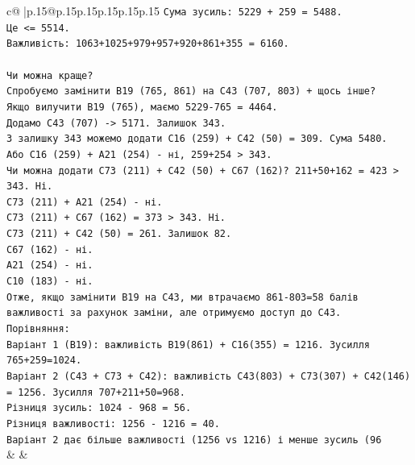 \documentclass{article}
\begin{document}
{\begin{supertabular}{c@{$\;$}|p{.15\linewidth}@{}p{.15\linewidth}p{.15\linewidth}p{.15\linewidth}p{.15\linewidth}p{.15\linewidth}}
{{{\texttt{Сума зусиль: 5229 + 259 = 5488.} \\
\texttt{Це <= 5514.} \\
\texttt{Важливість: 1063+1025+979+957+920+861+355 = 6160.} \\
\\ 
\texttt{Чи можна краще?} \\
\texttt{Спробуємо замінити B19 (765, 861) на C43 (707, 803) + щось інше?} \\
\texttt{Якщо вилучити B19 (765), маємо 5229{-}765 = 4464.} \\
\texttt{Додамо C43 (707) {-}> 5171. Залишок 343.} \\
\texttt{З залишку 343 можемо додати C16 (259) + C42 (50) = 309. Сума 5480.} \\
\texttt{Або C16 (259) + A21 (254) {-} ні, 259+254 > 343.} \\
\texttt{Чи можна додати C73 (211) + C42 (50) + C67 (162)? 211+50+162 = 423 > 343. Ні.} \\
\texttt{C73 (211) + A21 (254) {-} ні.} \\
\texttt{C73 (211) + C67 (162) = 373 > 343. Ні.} \\
\texttt{C73 (211) + C42 (50) = 261. Залишок 82.} \\
\texttt{C67 (162) {-} ні.} \\
\texttt{A21 (254) {-} ні.} \\
\texttt{C10 (183) {-} ні.} \\
\texttt{Отже, якщо замінити B19 на C43, ми втрачаємо 861{-}803=58 балів важливості за рахунок заміни, але отримуємо доступ до C43.} \\
\texttt{Порівняння:} \\
\texttt{Варіант 1 (B19): важливість B19(861) + C16(355) = 1216. Зусилля 765+259=1024.} \\
\texttt{Варіант 2 (C43 + C73 + C42): важливість C43(803) + C73(307) + C42(146) = 1256. Зусилля 707+211+50=968.} \\
\texttt{Різниця зусиль: 1024 {-} 968 = 56.} \\
\texttt{Різниця важливості: 1256 {-} 1216 = 40.} \\
\texttt{Варіант 2 дає більше важливості (1256 vs 1216) і менше зусиль (96} \\
            }
        }
    }
    & & \\ \\


\end{supertabular}}
\end{document}

